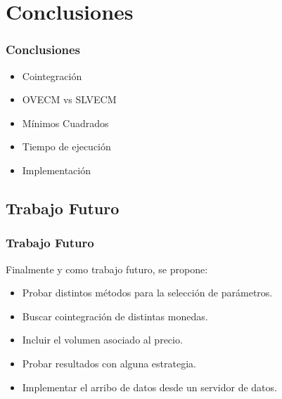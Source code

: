 \documentclass{beamer}
\begin{document}
    \section{Conclusiones}
            \begin{frame}
            \frametitle{Conclusiones}
            \begin{itemize}
            \item Cointegración
            \item OVECM vs SLVECM
            \item Mínimos Cuadrados
            \item Tiempo de ejecución
            \item Implementación
            \end{itemize}
            \end{frame}
        \subsection{Trabajo Futuro}
            \begin{frame}
            \frametitle{Trabajo Futuro}
            \newpage
            Finalmente y como trabajo futuro, se propone:
            \begin{itemize}
             \item Probar distintos métodos para la selección de parámetros. 
             \item Buscar cointegración de distintas monedas. 
             \item Incluir el volumen asociado al precio.
             \item Probar resultados con alguna estrategia. 
             \item Implementar el arribo de datos desde un servidor de datos. 
            \end{itemize}

            \end{frame}
    \frame{\titlepage}
\end{document}
